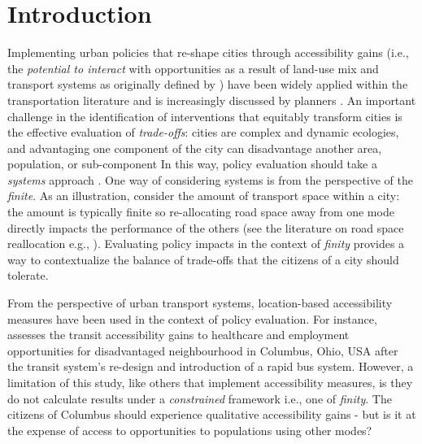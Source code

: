 \documentclass[]{trbunofficial}
\begin{document}
\hypertarget{introduction}{%
\section{Introduction}\label{introduction}}

Implementing urban policies that re-shape cities through accessibility
gains (i.e., the \emph{potential to interact} with opportunities as a
result of land-use mix and transport systems as originally defined by
\citet{hansenHowAccessibilityShapes1959}) have been widely applied
within the transportation literature and is increasingly discussed by
planners
\citep{levinsonTransportAccessManual2020, gowerPlanningInnovationCity2022, siddiqToolsTradeAssessing2021, yanAccessibilityBasedPlanningAddressing2021}.
An important challenge in the identification of interventions that
equitably transform cities is the effective evaluation of
\emph{trade-offs}: cities are complex and dynamic ecologies, and
advantaging one component of the city can disadvantage another area,
population, or sub-component In this way, policy evaluation should take
a \emph{systems} approach
\citep{fikselSustainabilityResilienceSystems2006}. One way of
considering systems is from the perspective of the \emph{finite}. As an
illustration, consider the amount of transport space within a city: the
amount is typically finite so re-allocating road space away from one
mode directly impacts the performance of the others (see the literature
on road space reallocation e.g.,
\citet{valencaMainChallengesOpportunities2021}). Evaluating policy
impacts in the context of \emph{finity} provides a way to contextualize
the balance of trade-offs that the citizens of a city should tolerate.

From the perspective of urban transport systems, location-based
accessibility measures have been used in the context of policy
evaluation. For instance, \citet{leeMeasuringImpactsNew2018} assesses
the transit accessibility gains to healthcare and employment
opportunities for disadvantaged neighbourhood in Columbus, Ohio, USA
after the transit system's re-design and introduction of a rapid bus
system. However, a limitation of this study, like others that implement
accessibility measures, is they do not calculate results under a
\emph{constrained} framework i.e., one of \emph{finity}. The citizens of
Columbus should experience qualitative accessibility gains - but is it
at the expense of access to opportunities to populations using other
modes?
\end{document}
